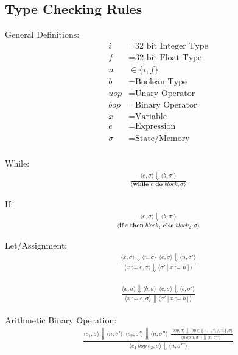 \documentclass[12pt]{article}
\begin{document}
    	\subsection{Type Checking Rules}
	General Definitions:
    	\begin{align*}
		i &= \text{32 bit Integer Type} \\
		f &= \text{32 bit Float Type} \\
		n &\in \{i, f\} \\
		b &= \text{Boolean Type} \\
		uop &= \text{Unary Operator} \\
		bop &= \text{Binary Operator} \\
		x &= \text{Variable} \\
		e &= \text{Expression} \\
		\sigma &= \text{State/Memory} \\
	\end{align*}

	While:
	\begin{align*}
		\frac{\langle e, \sigma \rangle\Downarrow \langle b, \sigma' \rangle}
		{\langle \textbf{while } e \textbf{ do } block, \sigma \rangle}
	\end{align*}

	If:
	\begin{align*}
		\frac{\langle e, \sigma \rangle\Downarrow \langle b, \sigma' \rangle}
		{\langle \textbf{if } e \textbf{ then } block_1 \textbf{ else } block_2, \sigma \rangle}
	\end{align*}

	Let/Assignment:
	\begin{align*}
		\frac{
			\langle x, \sigma \rangle\Downarrow \langle n, \sigma \rangle \ \ 
			\langle e, \sigma \rangle\Downarrow \langle n, \sigma' \rangle
		}
		{\langle x := e, \sigma \rangle\Downarrow \langle \sigma' [x := n] \rangle}
	\end{align*}

	\begin{align*}
		\frac{
			\langle x, \sigma \rangle\Downarrow \langle b, \sigma \rangle \ \ 
			\langle e, \sigma \rangle\Downarrow \langle b, \sigma' \rangle
		}
		{\langle x := e, \sigma \rangle\Downarrow \langle \sigma' [x := b] \rangle}
	\end{align*}


	Arithmetic Binary Operation:
	\begin{align*}
		\frac{
		\langle e_1, \sigma \rangle\Downarrow \langle n, \sigma' \rangle \ \ 
		\langle e_2, \sigma' \rangle\Downarrow \langle n, \sigma'' \rangle \ \ 
		\frac{
			\langle bop, \sigma \rangle\Downarrow \langle op \in \{+. -, *, /, \%\} , \sigma \rangle
		}{
			\langle n\ op\ n, \sigma'' \rangle\Downarrow \langle n, \sigma''' \rangle \ \ 
		}}
		{\langle e_1\ bop\ e_2, \sigma \rangle\Downarrow \langle n, \sigma''' \rangle}
	\end{align*}
\end{document}
